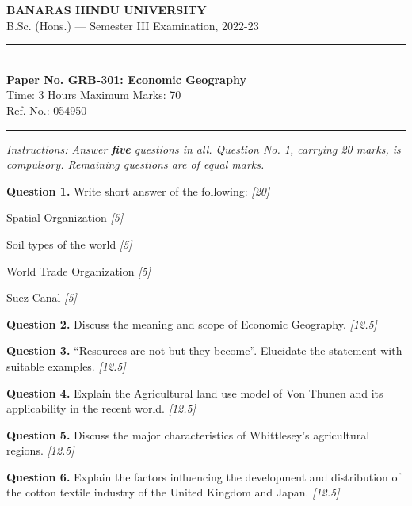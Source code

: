 \documentclass[11pt,a4paper]{article}
\newcommand{\pts}[1]{\hfill   \textit{[#1]}}
\begin{document}
\begin{center}
  {\large\bfseries BANARAS HINDU UNIVERSITY}\\[2pt]
  {\normalsize B.Sc. (Hons.) --- Semester III Examination, 2022-23}\\[6pt]
  \rule{0.8\linewidth}{0.5pt}\\[6pt]
  {\large\bfseries Paper No. GRB-301: Economic Geography}\\[4pt]
  {\normalsize Time: 3 Hours \hfill Maximum Marks: 70}\\[2pt]
  {\small Ref. No.: 054950}
\end{center}
\rule{\linewidth}{0.4pt}
\smallskip



\noindent   \textit{Instructions: Answer   \textbf{five} questions in all. Question No. 1, carrying 20 marks, is compulsory. Remaining questions are of equal marks.}
\bigskip




\noindent   \textbf{Question 1.} Write short answer of the following: \pts{20}

\begin{parts}
  \item Spatial Organization \pts{5}
  \item Soil types of the world \pts{5}
  \item World Trade Organization \pts{5}
  \item Suez Canal \pts{5}
\end{parts}

\medskip


\noindent   \textbf{Question 2.} Discuss the meaning and scope of Economic Geography. \pts{12.5}

\medskip


\noindent   \textbf{Question 3.} ``Resources are not but they become''. Elucidate the statement with suitable examples. \pts{12.5}

\medskip


\noindent   \textbf{Question 4.} Explain the Agricultural land use model of Von Thunen and its applicability in the recent world. \pts{12.5}

\medskip


\noindent   \textbf{Question 5.} Discuss the major characteristics of Whittlesey's agricultural regions. \pts{12.5}

\medskip


\noindent   \textbf{Question 6.} Explain the factors influencing the development and distribution of the cotton textile industry of the United Kingdom and Japan. \pts{12.5}
\end{document}
